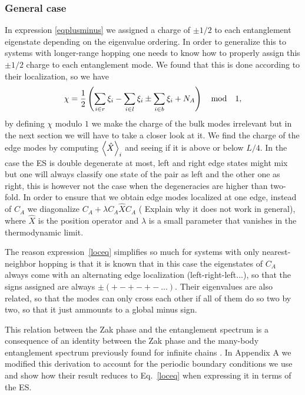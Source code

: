 \documentclass[twocolumn,amsmath,longbibliography,amssymb,superscriptaddress]{revtex4-1}
\newcommand{\carlos}[1]{{\color{red} #1}}
\begin{document}
\subsubsection{General case}

In expression 	\eqref{eqplusminus} we assigned a charge of $\pm1/2$ to each entanglement eigenstate depending on the eigenvalue ordering. 
In order to generalize this to systems with longer-range hopping one needs to know how to properly assign this $\pm 1/2$ charge to each entanglement mode. We found that this is done according to their localization, so we have
\begin{equation}
\chi = \frac{1}{2} \left( \sum_{i\in r}\xi_i-\sum_{i\in l}\xi_i \pm \sum_{i\in b}\xi_i  + N_A \right) \quad {\rm mod} \quad 1,
\label{loceq}
\end{equation}
by defining $ \chi$ modulo $1$ we make the charge of the bulk modes irrelevant but in the next section we will have to take a closer look at it. We find the charge of the edge modes by computing $\expval{\hat{X}}_i$ and seeing if it is above or below $L/4$. In the case the ES is double degenerate at most, left and right edge states might mix but one will always classify one state of the pair as left and the other one as right, this is however not the case when the degeneracies are higher than two-fold. In order to ensure that we obtain edge modes localized at one edge, instead of $C_A$ we diagonalize $C_A + \lambda C_A\hat{X}C_A$ (\carlos{Explain why it does not work in general}), where $\hat{X}$ is the position operator and $\lambda$ is a small parameter that vanishes in the thermodynamic limit. 

The reason expression~\eqref{loceq} simplifies so much for systems with only nearest-neighbor hopping is that it is known that in this case the eigenstates of $C_A$ always come with an alternating edge localization (left-right-left...), so that the signs assigned are always $ \pm(+-+-+-...)$. Their eigenvalues are also related, so that the modes can only cross each other if all of them do so two by two, so that it just ammounts to a global minus sign.

This relation between the Zak phase and the entanglement spectrum is a consequence of an identity between the Zak phase and the many-body entanglement spectrum previously found for infinite chains \cite{Zaletel2014}. In Appendix A we modified this derivation to account for the periodic boundary conditions we use and show how their result reduces to Eq.~\eqref{loceq} when expressing it in terms of the ES.
\end{document}
